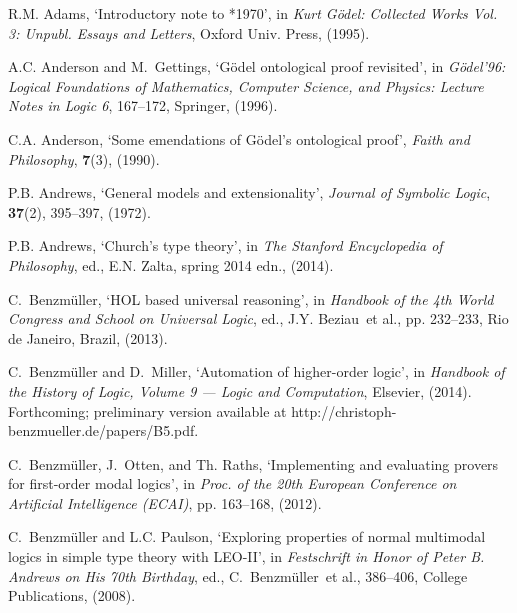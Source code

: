 \documentclass{birkjour}
\theoremstyle{definition}
\theoremstyle{remark}
\numberwithin{equation}{section}
\begin{document}

\begin{thebibliography}{1}

R.M. Adams, `Introductory note to *1970', in {\em {Kurt G\"odel: Collected
  Works Vol. 3: Unpubl. Essays and Letters}}, Oxford Univ. Press, (1995).

A.C. Anderson and M.~Gettings, `G\"odel ontological proof revisited', in {\em
  {G\"odel'96: Logical Foundations of Mathematics, Computer Science, and
  Physics: Lecture Notes in Logic 6}},  167--172, {Springer}, (1996).

C.A. Anderson, `Some emendations of {G{\"o}del's} ontological proof', {\em
  Faith and Philosophy}, {\bf 7}(3), (1990).

P.B. Andrews, `General models and extensionality', {\em Journal of Symbolic
  Logic}, {\bf 37}(2),  395--397, (1972).

P.B. Andrews, `Church's type theory', in {\em The Stanford Encyclopedia of
  Philosophy}, ed., E.N. Zalta, spring 2014 edn., (2014).

C.~Benzm{\"u}ller, `{HOL} based universal reasoning', in {\em Handbook of the
  4th World Congress and School on Universal Logic}, ed., J.Y. Beziau~et al.,
  pp. 232--233, Rio de Janeiro, Brazil, (2013).

C.~Benzm{\"u}ller and D.~Miller, `Automation of higher-order logic', in {\em
  Handbook of the History of Logic, Volume 9 --- Logic and Computation},
  Elsevier, (2014).
\newblock Forthcoming; preliminary version available at
  {http://christoph-benzmueller.de/papers/B5.pdf}.

C.~Benzm{\"u}ller, J.~Otten, and Th. Raths, `Implementing and evaluating
  provers for first-order modal logics', in {\em Proc. of the 20th European
  Conference on Artificial Intelligence (ECAI)}, pp. 163--168, (2012).

C.~Benzm{\"u}ller and L.C. Paulson, `Exploring properties of normal multimodal
  logics in simple type theory with {LEO-II}', in {\em {Festschrift in Honor of
  {Peter B. Andrews} on His 70th Birthday}}, ed., C.~Benzm{\"u}ller~et al.,
  386--406, College Publications, (2008).


\end{thebibliography}
\end{document}
